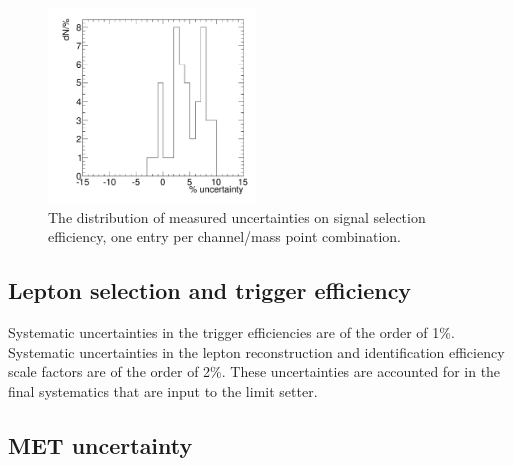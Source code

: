 \begin{figure}[htb]
\center
  \includegraphics[width=0.49\textwidth]{plots/anaexample/sigseleffuncdist.pdf}
  \caption{The distribution of measured uncertainties on signal
selection efficiency, one entry per channel/mass point
combination.
}
\label{fig:sys:sigseleffuncdist}
\end{figure}

\subsection{Lepton selection and trigger efficiency}
Systematic uncertainties in the trigger efficiencies
are of the order of 1\%. Systematic uncertainties in the lepton reconstruction
and identification efficiency scale factors are of the order of 2\%. These uncertainties
are accounted for in the final systematics that are input to the limit setter.

\subsection{MET uncertainty}

